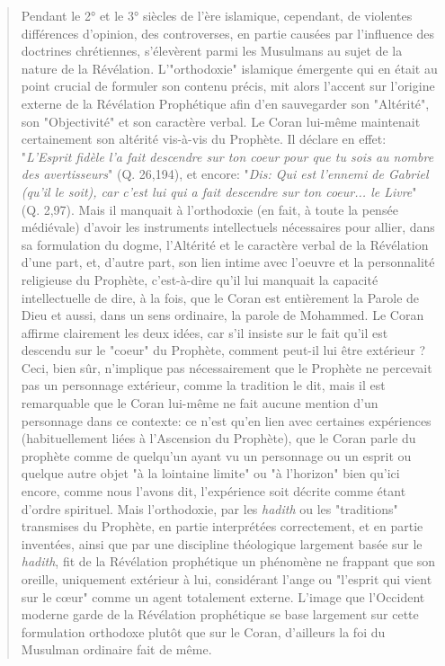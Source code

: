 \begin{quote}
Pendant le 2° et le 3° siècles de l'ère islamique, cependant, de
violentes différences d'opinion, des controverses, en partie causées par
l'influence des doctrines chrétiennes, s'élevèrent parmi les Musulmans
au sujet de la nature de la Révélation. L'"orthodoxie" islamique
émergente qui en était au point crucial de formuler son contenu précis,
mit alors l'accent sur l'origine externe de la Révélation Prophétique
afin d'en sauvegarder son "Altérité", son "Objectivité" et son caractère
verbal. Le Coran lui-même maintenait certainement son altérité vis-à-vis
du Prophète. Il déclare en effet: "\emph{L'Esprit fidèle l'a fait
descendre sur ton coeur pour que tu sois au nombre des avertisseurs}"
(Q. 26,194), et encore: "\emph{Dis: Qui est l'ennemi de Gabriel (qu'il
le soit), car c'est lui qui a fait descendre sur ton coeur... le Livre}"
(Q. 2,97). Mais il manquait à l'orthodoxie (en fait, à toute la pensée
médiévale) d'avoir les instruments intellectuels nécessaires pour
allier, dans sa formulation du dogme, l'Altérité et le caractère verbal
de la Révélation d'une part, et, d'autre part, son lien intime avec
l'oeuvre et la personnalité religieuse du Prophète, c'est-à-dire qu'il
lui manquait la capacité intellectuelle de dire, à la fois, que le Coran
est entièrement la Parole de Dieu et aussi, dans un sens ordinaire, la
parole de Mohammed. Le Coran affirme clairement les deux idées, car s'il
insiste sur le fait qu'il est descendu sur le "coeur" du Prophète,
comment peut-il lui être extérieur ? Ceci, bien sûr, n'implique pas
nécessairement que le Prophète ne percevait pas un personnage extérieur,
comme la tradition le dit, mais il est remarquable que le Coran lui-même
ne fait aucune mention d'un personnage dans ce contexte: ce n'est qu'en
lien avec certaines expériences (habituellement liées à l'Ascension du
Prophète), que le Coran parle du prophète comme de quelqu'un ayant vu un
personnage ou un esprit ou quelque autre objet "à la lointaine limite"
ou "à l'horizon" bien qu'ici encore, comme nous l'avons dit,
l'expérience soit décrite comme étant d'ordre spirituel. Mais
l'orthodoxie, par les \emph{hadith} ou les "traditions" transmises du
Prophète, en partie interprétées correctement, et en partie inventées,
ainsi que par une discipline théologique largement basée sur le
\emph{hadith}, fit de la Révélation prophétique un phénomène ne frappant
que son oreille, uniquement extérieur à lui, considérant l'ange ou
"l'esprit qui vient sur le cœur" comme un agent totalement externe.
L'image que l'Occident moderne garde de la Révélation prophétique se
base largement sur cette formulation orthodoxe plutôt que sur le Coran,
d'ailleurs la foi du Musulman ordinaire fait de même.


\end{quote}

